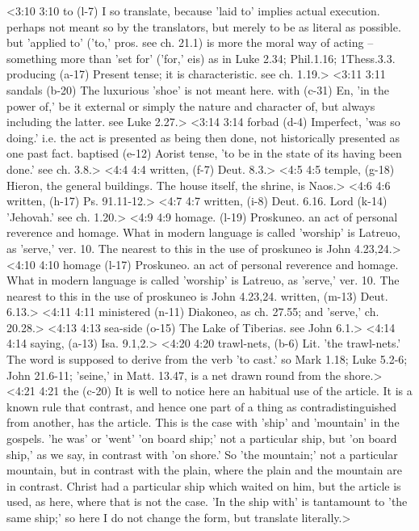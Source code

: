 <3:10 3:10  to (l-7)  I so translate, because 'laid to' implies actual execution.  perhaps not meant so by the translators, but merely to be as  literal as possible. but 'applied to' ('to,' pros. see ch. 21.1)  is more the moral way of acting -- something more than  'set for' ('for,' eis) as in Luke 2.34; Phil.1.16; 1Thess.3.3.
  producing (a-17)  Present tense; it is characteristic. see ch. 1.19.>
<3:11 3:11  sandals (b-20)  The luxurious 'shoe' is not meant here.
  with (c-31)  En, 'in the power of,' be it external or simply the nature  and character of, but always including the latter. see Luke 2.27.>
<3:14 3:14  forbad (d-4)  Imperfect, 'was so doing.' i.e. the act is presented as being  then done, not historically presented as one past fact.
  baptised (e-12)  Aorist tense, 'to be in the state of its having been done.'  see ch. 3.8.>
<4:4 4:4  written, (f-7)  Deut. 8.3.>
<4:5 4:5  temple, (g-18)  Hieron, the general buildings. The house itself, the  shrine, is Naos.>
<4:6 4:6  written, (h-17)  Ps. 91.11-12.>
<4:7 4:7  written, (i-8)  Deut. 6.16.
  Lord (k-14)  'Jehovah.' see ch. 1.20.>
<4:9 4:9  homage. (l-19)  Proskuneo. an act of personal reverence and homage. What in  modern language is called 'worship' is Latreuo, as 'serve,'  ver. 10. The nearest to this in the use of proskuneo is John 4.23,24.>
<4:10 4:10  homage (l-17)  Proskuneo. an act of personal reverence and homage. What in  modern language is called 'worship' is Latreuo, as 'serve,'  ver. 10. The nearest to this in the use of proskuneo is John 4.23,24.
  written, (m-13)  Deut. 6.13.>
<4:11 4:11  ministered (n-11)  Diakoneo, as ch. 27.55; and 'serve,' ch. 20.28.>
<4:13 4:13  sea-side (o-15)  The Lake of Tiberias. see John 6.1.>
<4:14 4:14  saying, (a-13)  Isa. 9.1,2.>
<4:20 4:20  trawl-nets, (b-6)  Lit. 'the trawl-nets.' The word is supposed to derive from  the verb 'to cast.' so Mark 1.18; Luke 5.2-6; John 21.6-11;  'seine,' in Matt. 13.47, is a net drawn round from the shore.>
<4:21 4:21  the (c-20)  It is well to notice here an habitual use of the article. It is a known  rule that contrast, and hence one part of a thing as  contradistinguished from another, has the article. This is the case  with 'ship' and 'mountain' in the gospels. 'he was' or 'went'  'on board ship;' not a particular ship, but 'on board  ship,' as we say, in contrast with 'on shore.' So 'the  mountain;' not a particular mountain, but in contrast with the  plain, where the plain and the mountain are in contrast. Christ  had a particular ship which waited on him, but the article is  used, as here, where that is not the case. 'In the ship with'  is tantamount to 'the same ship;' so here I do not change the  form, but translate literally.>

